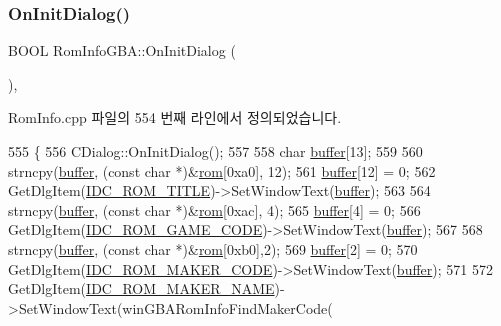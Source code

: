 \subsubsection{\texorpdfstring{On\+Init\+Dialog()}{OnInitDialog()}}
{\footnotesize\ttfamily B\+O\+OL Rom\+Info\+G\+B\+A\+::\+On\+Init\+Dialog (\begin{DoxyParamCaption}{ }\end{DoxyParamCaption})\hspace{0.3cm}{\ttfamily [protected]}, {\ttfamily [virtual]}}



Rom\+Info.\+cpp 파일의 554 번째 라인에서 정의되었습니다.


\begin{DoxyCode}
555 \{
556   CDialog::OnInitDialog();
557 
558   \textcolor{keywordtype}{char} \mbox{\hyperlink{_g_b_a_8cpp_a28d4d3d8445e73a696b2d6f7eadabd96}{buffer}}[13];
559 
560   strncpy(\mbox{\hyperlink{_g_b_a_8cpp_a28d4d3d8445e73a696b2d6f7eadabd96}{buffer}}, (\textcolor{keyword}{const} \textcolor{keywordtype}{char} *)&\mbox{\hyperlink{class_rom_info_g_b_a_af44895da29e3b91d95cd31f3acb0eb60}{rom}}[0xa0], 12);
561   \mbox{\hyperlink{_g_b_a_8cpp_a28d4d3d8445e73a696b2d6f7eadabd96}{buffer}}[12] = 0;
562   GetDlgItem(\mbox{\hyperlink{resource_8h_abb84afdca45bbfe3549191640e97be63}{IDC\_ROM\_TITLE}})->SetWindowText(\mbox{\hyperlink{_g_b_a_8cpp_a28d4d3d8445e73a696b2d6f7eadabd96}{buffer}});
563 
564   strncpy(\mbox{\hyperlink{_g_b_a_8cpp_a28d4d3d8445e73a696b2d6f7eadabd96}{buffer}}, (\textcolor{keyword}{const} \textcolor{keywordtype}{char} *)&\mbox{\hyperlink{class_rom_info_g_b_a_af44895da29e3b91d95cd31f3acb0eb60}{rom}}[0xac], 4);
565   \mbox{\hyperlink{_g_b_a_8cpp_a28d4d3d8445e73a696b2d6f7eadabd96}{buffer}}[4] = 0;
566   GetDlgItem(\mbox{\hyperlink{resource_8h_a123d4ab08df30092a6706ed90992a4ce}{IDC\_ROM\_GAME\_CODE}})->SetWindowText(\mbox{\hyperlink{_g_b_a_8cpp_a28d4d3d8445e73a696b2d6f7eadabd96}{buffer}});
567 
568   strncpy(\mbox{\hyperlink{_g_b_a_8cpp_a28d4d3d8445e73a696b2d6f7eadabd96}{buffer}}, (\textcolor{keyword}{const} \textcolor{keywordtype}{char} *)&\mbox{\hyperlink{class_rom_info_g_b_a_af44895da29e3b91d95cd31f3acb0eb60}{rom}}[0xb0],2);
569   \mbox{\hyperlink{_g_b_a_8cpp_a28d4d3d8445e73a696b2d6f7eadabd96}{buffer}}[2] = 0;
570   GetDlgItem(\mbox{\hyperlink{resource_8h_adb5db445e06db6bc262e4d08818ad07b}{IDC\_ROM\_MAKER\_CODE}})->SetWindowText(\mbox{\hyperlink{_g_b_a_8cpp_a28d4d3d8445e73a696b2d6f7eadabd96}{buffer}});
571 
572   GetDlgItem(\mbox{\hyperlink{resource_8h_a474cb483130635a7f55250fc5efc6e34}{IDC\_ROM\_MAKER\_NAME}})->SetWindowText(winGBARomInfoFindMakerCode(

\end{DoxyCode}
